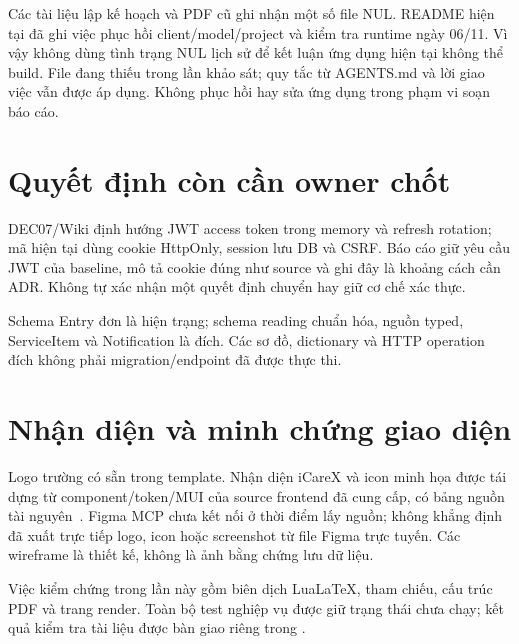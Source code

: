 Các tài liệu lập kế hoạch và PDF cũ ghi nhận một số file NUL. README hiện tại đã ghi việc phục hồi client/model/project và kiểm tra runtime ngày 06/11. Vì vậy không dùng tình trạng NUL lịch sử để kết luận ứng dụng hiện tại không thể build. File  đang thiếu trong lần khảo sát; quy tắc từ AGENTS.md và lời giao việc vẫn được áp dụng. Không phục hồi hay sửa ứng dụng trong phạm vi soạn báo cáo.

\section*{Quyết định còn cần owner chốt}
DEC07/Wiki định hướng JWT access token trong memory và refresh rotation; mã hiện tại dùng cookie HttpOnly, session lưu DB và CSRF. Báo cáo giữ yêu cầu JWT của baseline, mô tả cookie đúng như source và ghi đây là khoảng cách cần ADR. Không tự xác nhận một quyết định chuyển hay giữ cơ chế xác thực.

Schema Entry đơn là hiện trạng; schema reading chuẩn hóa, nguồn typed, ServiceItem và Notification là đích. Các sơ đồ, dictionary và HTTP operation đích không phải migration/endpoint đã được thực thi.

\section*{Nhận diện và minh chứng giao diện}
Logo trường có sẵn trong template. Nhận diện iCareX và icon minh họa được tái dựng từ component/token/MUI của source frontend đã cung cấp, có bảng nguồn tài nguyên~\cite{brandlocal}. Figma MCP chưa kết nối ở thời điểm lấy nguồn; không khẳng định đã xuất trực tiếp logo, icon hoặc screenshot từ file Figma trực tuyến. Các wireframe là thiết kế, không là ảnh bằng chứng lưu dữ liệu.

Việc kiểm chứng trong lần này gồm biên dịch LuaLaTeX, tham chiếu, cấu trúc PDF và trang render. Toàn bộ test nghiệp vụ được giữ trạng thái chưa chạy; kết quả kiểm tra tài liệu được bàn giao riêng trong .
